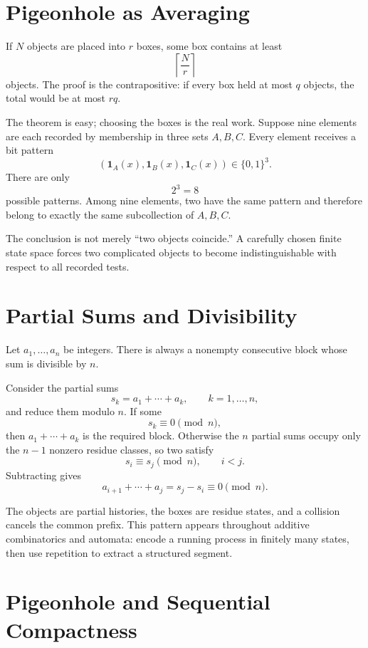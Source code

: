 
\section{Pigeonhole as Averaging}

If \(N\) objects are placed into \(r\) boxes, some box contains at least
\[
  \left\lceil\frac Nr\right\rceil
\]
objects.  The proof is the contrapositive: if every box held at most \(q\) objects, the total would be at most \(rq\).

The theorem is easy; choosing the boxes is the real work.  Suppose nine elements are each recorded by membership in three sets \(A,B,C\).  Every element receives a bit pattern
\[
  (\mathbf1_A(x),\mathbf1_B(x),\mathbf1_C(x))
  \in\{0,1\}^3.
\]
There are only
\[
  2^3=8
\]
possible patterns.  Among nine elements, two have the same pattern and therefore belong to exactly the same subcollection of \(A,B,C\).

The conclusion is not merely “two objects coincide.”  A carefully chosen finite state space forces two complicated objects to become indistinguishable with respect to all recorded tests.

\section{Partial Sums and Divisibility}

Let \(a_1,\ldots,a_n\) be integers.  There is always a nonempty consecutive block whose sum is divisible by \(n\).

Consider the partial sums
\[
  s_k=a_1+\cdots+a_k,
  \qquad k=1,\ldots,n,
\]
and reduce them modulo \(n\).  If some
\[
  s_k\equiv0\pmod n,
\]
then \(a_1+\cdots+a_k\) is the required block.  Otherwise the \(n\) partial sums occupy only the \(n-1\) nonzero residue classes, so two satisfy
\[
  s_i\equiv s_j\pmod n,
  \qquad i<j.
\]
Subtracting gives
\[
  a_{i+1}+\cdots+a_j
  =s_j-s_i
  \equiv0\pmod n.
\]

The objects are partial histories, the boxes are residue states, and a collision cancels the common prefix.  This pattern appears throughout additive combinatorics and automata: encode a running process in finitely many states, then use repetition to extract a structured segment.

\section{Pigeonhole and Sequential Compactness}

